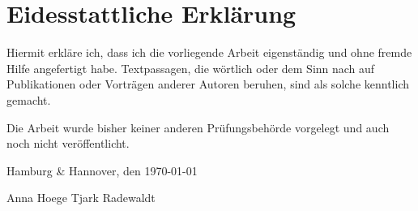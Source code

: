 \section*{Eidesstattliche Erklärung}

Hiermit erkläre ich, dass ich die vorliegende Arbeit eigenständig und ohne fremde Hilfe angefertigt habe. Textpassagen, die wörtlich oder dem Sinn nach auf Publikationen oder Vorträgen anderer Autoren beruhen, sind als solche kenntlich gemacht.

Die Arbeit wurde bisher keiner anderen Prüfungsbehörde vorgelegt und auch noch nicht veröffentlicht. \newline

Hamburg \& Hannover, den \today

\vspace{15mm}

Anna Hoege \hspace*{50mm} Tjark Radewaldt    

